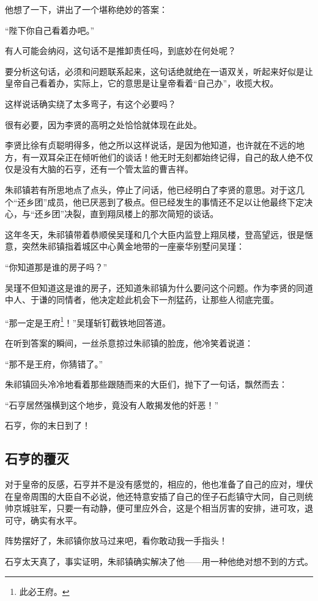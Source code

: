 \begin{multicols}{\theparacolNo}
		他想了一下，讲出了一个堪称绝妙的答案：

		“陛下你自己看着办吧。”

		有人可能会纳闷，这句话不是推卸责任吗，到底妙在何处呢？

		要分析这句话，必须和问题联系起来，这句话绝就绝在一语双关，听起来好似是让皇帝自己看着办，实际上，它的意思是让皇帝看着“自己办”，收揽大权。

		这样说话确实绕了太多弯子，有这个必要吗？

		很有必要，因为李贤的高明之处恰恰就体现在此处。

		李贤比徐有贞聪明得多，他之所以这样说话，是因为他知道，也许就在不远的地方，有一双耳朵正在倾听他们的谈话！他无时无刻都始终记得，自己的敌人绝不仅仅是没有大脑的石亨，还有一个管太监的曹吉祥。

		朱祁镇若有所思地点了点头，停止了问话，他已经明白了李贤的意思。对于这几个“还乡团”成员，他已厌恶到了极点。但已经发生的事情还不足以让他最终下定决心，与“还乡团”决裂，直到翔凤楼上的那次简短的谈话。

		这年冬天，朱祁镇带着恭顺侯吴瑾和几个大臣内监登上翔凤楼，登高望远，很是惬意，突然朱祁镇指着城区中心黄金地带的一座豪华别墅问吴瑾：

		“你知道那是谁的房子吗？”

		吴瑾不但知道这是谁的房子，还知道朱祁镇为什么要问这个问题。作为李贤的同道中人、于谦的同情者，他决定趁此机会下一剂猛药，让那些人彻底完蛋。

		“那一定是王府\footnote{此必王府。}！”吴瑾斩钉截铁地回答道。

		在听到答案的瞬间，一丝杀意掠过朱祁镇的脸庞，他冷笑着说道：

		“那不是王府，你猜错了。”

		朱祁镇回头冷冷地看着那些跟随而来的大臣们，抛下了一句话，飘然而去：

		“石亨居然强横到这个地步，竟没有人敢揭发他的奸恶！”

		石亨，你的末日到了！

		\subsection{石亨的覆灭}
		对于皇帝的反感，石亨并不是没有感觉的，相应的，他也准备了自己的应对，埋伏在皇帝周围的大臣自不必说，他还特意安插了自己的侄子石彪镇守大同，自己则统帅京城驻军，只要一有动静，便可里应外合，这是个相当厉害的安排，进可攻，退可守，确实有水平。

		阵势摆好了，朱祁镇你放马过来吧，看你敢动我一手指头！

		石亨太天真了，事实证明，朱祁镇确实解决了他——用一种他绝对想不到的方式。


\end{multicols}
